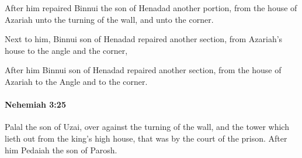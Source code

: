 			\begin{versebox}
					\item[BHS] 
					\item[LXX] 
					\item[ASV] After him repaired Binnui the son of Henadad another portion, from the house of Azariah unto the turning of the wall, and unto the corner.
					\item[NIV] Next to him, Binnui son of Henadad repaired another section, from Azariah’s house to the angle and the corner,
					\item[NRSV] After him Binnui son of Henadad repaired another section, from the house of Azariah to the Angle and to the corner.
			\end{versebox}

		\paragraph{Nehemiah 3:25} %
			\label{NEHEMIAH-3-25}

			Palal the son of Uzai, over against the turning of the wall, and the tower which lieth out from the king’s high house, that was by the court of the prison. After him Pedaiah the son of Parosh.

